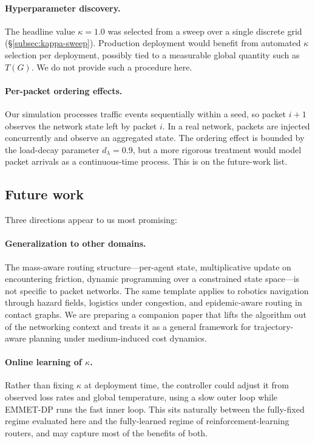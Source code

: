 \paragraph{Hyperparameter discovery.}
The headline value $\kappa = 1.0$ was selected from a sweep over a
single discrete grid (\S\ref{subsec:kappa-sweep}). Production
deployment would benefit from automated $\kappa$ selection per
deployment, possibly tied to a measurable global quantity such as
$T(G)$. We do not provide such a procedure here.

\paragraph{Per-packet ordering effects.}
Our simulation processes traffic events sequentially within a
seed, so packet $i+1$ observes the network state left by packet
$i$. In a real network, packets are injected concurrently and
observe an aggregated state. The ordering effect is bounded by
the load-decay parameter $d_\lambda = 0.9$, but a more rigorous
treatment would model packet arrivals as a continuous-time
process. This is on the future-work list.

\subsection{Future work}
\label{subsec:future-work}

Three directions appear to us most promising:

\paragraph{Generalization to other domains.}
The mass-aware routing structure—per-agent state, multiplicative
update on encountering friction, dynamic programming over a
constrained state space—is not specific to packet networks. The
same template applies to robotics navigation through hazard
fields, logistics under congestion, and epidemic-aware routing in
contact graphs. We are preparing a companion paper that lifts the
algorithm out of the networking context and treats it as a
general framework for trajectory-aware planning under
medium-induced cost dynamics.

\paragraph{Online learning of $\kappa$.}
Rather than fixing $\kappa$ at deployment time, the controller
could adjust it from observed loss rates and global temperature,
using a slow outer loop while EMMET-DP runs the fast inner loop.
This sits naturally between the fully-fixed regime evaluated here
and the fully-learned regime of reinforcement-learning routers,
and may capture most of the benefits of both.

